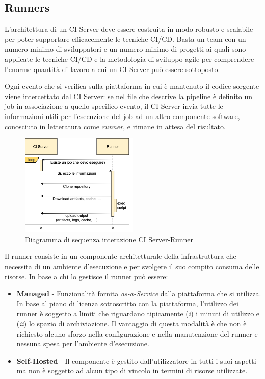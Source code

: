 \subsection{Runners}
L'architettura di un CI Server deve essere costruita in modo robusto e scalabile per poter supportare efficacemente le tecniche CI/CD.
Basta un team con un numero minimo di sviluppatori e un numero minimo di progetti ai quali sono applicate le tecniche CI/CD e la metodologia di sviluppo agile per comprendere l'enorme quantità di lavoro a cui un CI Server può essere sottoposto.

Ogni evento che si verifica sulla piattaforma in cui è mantenuto il codice sorgente viene intercettato dal CI Server: 
se nel file che descrive la pipeline è definito un job in associazione a quello specifico evento, 
il CI Server invia tutte le informazioni utili per l'esecuzione del job ad un altro componente software, 
conosciuto in letteratura come \textit{runner}, 
e rimane in attesa del risultato.

\begin{figure}[H]
    \centering
    \includegraphics[width=0.5\textwidth]{img/ciserver-runner.png}
    \caption{Diagramma di sequenza interazione CI Server-Runner}
    \label{ci-server-runner}
\end{figure}

Il runner consiste in un componente architetturale della infrastruttura che necessita di un ambiente d'esecuzione e per svolgere il suo compito consuma delle risorse. 
In base a chi lo gestisce il runner può essere:

\begin{itemize}
    \item \textbf{Managed} - Funzionalità fornita \textit{as-a-Service} dalla piattaforma che si utilizza. In base al piano di licenza sottoscritto con la piattaforma, l'utilizzo dei runner è soggetto a limiti che riguardano tipicamente (\textit{i}) i minuti di utilizzo e (\textit{ii}) lo spazio di archiviazione. Il vantaggio di questa modalità è che non è richiesto alcuno sforzo nella configurazione e nella manutenzione del runner e nessuna spesa per l'ambiente d'esecuzione.
    
    \item \textbf{Self-Hosted} - Il componente è gestito dall'utilizzatore in tutti i suoi aspetti ma non è soggetto ad alcun tipo di vincolo in termini di risorse utilizzate.
\end{itemize}